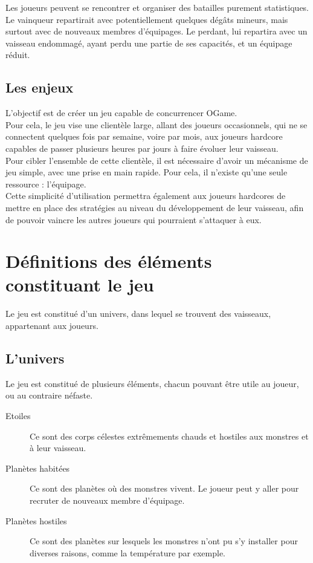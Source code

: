 \documentclass[a4paper,11pt]{report}
\begin{document}
    Les joueurs peuvent se rencontrer et organiser des batailles purement statistiques. Le vainqueur repartirait avec potentiellement quelques dégâts mineurs, mais surtout avec de nouveaux membres d’équipages. Le perdant, lui repartira avec un vaisseau endommagé, ayant perdu une partie de ses capacités, et un équipage réduit.\\

    \section{Les enjeux}
    L'objectif est de créer un jeu capable de concurrencer OGame.\\

    Pour cela, le jeu vise une clientèle large, allant des joueurs occasionnels, qui ne se connectent quelques fois par semaine, voire par mois, aux joueurs hardcore capables de passer plusieurs heures par jours à faire évoluer leur vaisseau.\\

    Pour cibler l'ensemble de cette clientèle, il est nécessaire d'avoir un mécanisme de jeu simple, avec une prise en main rapide. Pour cela, il n'existe qu'une seule ressource : l'équipage.\\

    Cette simplicité d'utilisation permettra également aux joueurs hardcores de mettre en place des stratégies au niveau du développement de leur vaisseau, afin de pouvoir vaincre les autres joueurs qui pourraient s'attaquer à eux.\\

\chapter{Définitions des éléments constituant le jeu}
    Le jeu est constitué d'un univers, dans lequel se trouvent des vaisseaux, appartenant aux joueurs.
    \section{L'univers}
        Le jeu est constitué de plusieurs éléments, chacun pouvant être utile au joueur, ou au contraire néfaste.
        \begin{description}
            \item[Etoiles] Ce sont des corps célestes extrêmements chauds et hostiles aux monstres et à leur vaisseau.
            \item[Planètes habitées] Ce sont des planètes où des monstres vivent. Le joueur peut y aller pour recruter de nouveaux membre d'équipage.
            \item[Planètes hostiles] Ce sont des planètes sur lesquels les monstres n'ont pu s'y installer pour diverses raisons, comme la température par exemple.
        \end{description}
      
\end{document}
